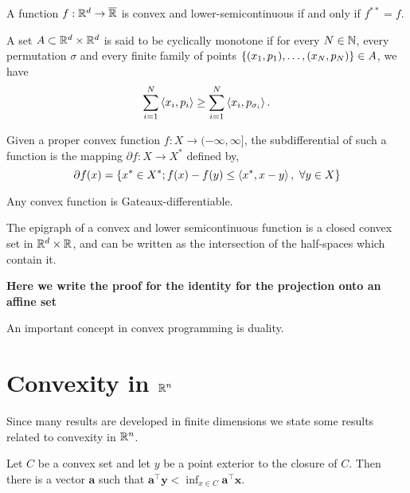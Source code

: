 \begin{corollary} 
	A function $f:\mathbb{R}^d \rightarrow \overline{\mathbb{R}}$ is convex and lower-semicontinuous if and only if $f^{**}=f$.
\end{corollary}
\begin{definition}
A set $A\subset \mathbb{R}^d\times\mathbb{R}^d$ is said to be cyclically monotone if for every $N\in \mathbb{N}$,  every permutation $\sigma$ and every finite family of points $\left\lbrace (x_1, p_1), \dots, (x_N, p_N) \right\rbrace\in A$, we have
\begin{equation}
	\sum_{i=1}^{N}\left\langle x_i, p_i \right\rangle \geq \sum_{i=1}^{N}\left\langle x_i, p_{\sigma_i} \right\rangle.
\end{equation}
\end{definition}
\begin{definition}[Subdifferential]
	Given a proper convex function $f: X\rightarrow (-\infty, \infty]$, the subdifferential of such a function is the mapping $\partial f: X\rightarrow X^*$ defined by,
	\begin{equation*}
		\partial f (x)= \left\lbrace x^*\in X^*; f(x)-f(y) \leq \left\langle x^*, x-y \right\rangle,\ \forall y \in X \right\rbrace
	\end{equation*}
\end{definition}

\begin{definition}
\end{definition}
\begin{theorem}
	Any convex function is Gateaux-differentiable.
\end{theorem}
\begin{theorem}
	The epigraph of a convex and lower semicontinuous function is a closed convex set in $\mathbb{R}^d\times\mathbb{R}$, and can be written as the intersection of the half-spaces which contain it.
\end{theorem}
	\textbf{Here we write the proof for the identity for the projection onto an affine set}
\begin{definition}
\end{definition}
\begin{theorem}
\end{theorem}

An important concept in convex programming is duality.


\begin{definition}[Duality]

\end{definition}

\section{Convexity in $\mathbb{R}^n$}
Since many results are developed in finite dimensions we state some results related to convexity in $\mathbb{R}^n$.
\begin{theorem}
Let $C$ be a convex set and let $y$ be a point exterior to the closure of $C$. Then there is a vector $\mathbf{a}$ such that $\mathbf{a}^\top \mathbf{y} < \inf_{x\in C} \mathbf{a}^\top \mathbf{x}$. 
\end{theorem}

